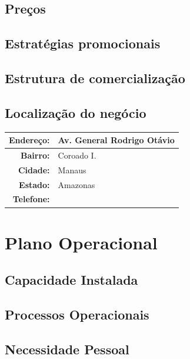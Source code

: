 \documentclass[
	12pt,				%
	openright,			%
	twoside,			%
	a4paper,			%
	english,			%
	french,				%
	spanish,			%
	brazil,				%
	]{abntex2}
\begin{document}
\section{Preços}

\section{Estratégias promocionais}

\section{Estrutura de comercialização}

\section{Localização do negócio}

\begin{center}
	\begin{tabular}{|r|p{12cm}|}
		\hline
		\textbf{Endereço:}	& Av. General Rodrigo Otávio \\ \hline
		\textbf{Bairro:}	& Coroado I. \\ \hline
		\textbf{Cidade:}	& Manaus \\ \hline
		\textbf{Estado:}	& Amazonas \\ \hline
		\textbf{Telefone:}	&  \\ \hline
	\end{tabular}
\end{center}



\chapter{Plano Operacional}

\section{Capacidade Instalada}

\section{Processos Operacionais}

\section{Necessidade Pessoal}
\end{document}
